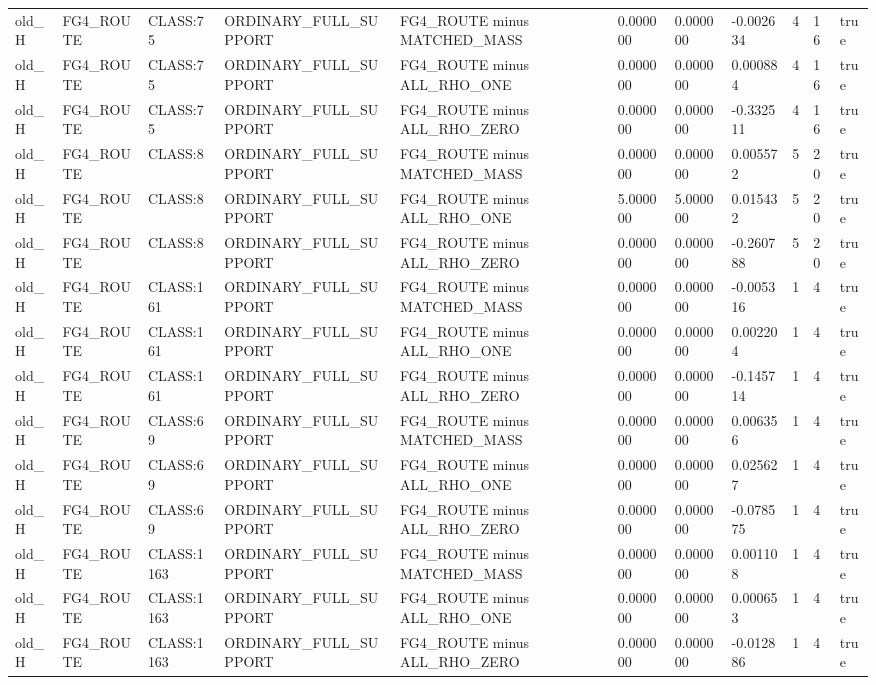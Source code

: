 \begin{tabular}{lllllllllll}
old\_H & FG4\_ROUTE & CLASS:75 & ORDINARY\_FULL\_SUPPORT & FG4\_ROUTE minus MATCHED\_MASS & 0.000000 & 0.000000 & -0.002634 & 4 & 16 & true \\
old\_H & FG4\_ROUTE & CLASS:75 & ORDINARY\_FULL\_SUPPORT & FG4\_ROUTE minus ALL\_RHO\_ONE & 0.000000 & 0.000000 & 0.000884 & 4 & 16 & true \\
old\_H & FG4\_ROUTE & CLASS:75 & ORDINARY\_FULL\_SUPPORT & FG4\_ROUTE minus ALL\_RHO\_ZERO & 0.000000 & 0.000000 & -0.332511 & 4 & 16 & true \\
old\_H & FG4\_ROUTE & CLASS:8 & ORDINARY\_FULL\_SUPPORT & FG4\_ROUTE minus MATCHED\_MASS & 0.000000 & 0.000000 & 0.005572 & 5 & 20 & true \\
old\_H & FG4\_ROUTE & CLASS:8 & ORDINARY\_FULL\_SUPPORT & FG4\_ROUTE minus ALL\_RHO\_ONE & 5.000000 & 5.000000 & 0.015432 & 5 & 20 & true \\
old\_H & FG4\_ROUTE & CLASS:8 & ORDINARY\_FULL\_SUPPORT & FG4\_ROUTE minus ALL\_RHO\_ZERO & 0.000000 & 0.000000 & -0.260788 & 5 & 20 & true \\
old\_H & FG4\_ROUTE & CLASS:161 & ORDINARY\_FULL\_SUPPORT & FG4\_ROUTE minus MATCHED\_MASS & 0.000000 & 0.000000 & -0.005316 & 1 & 4 & true \\
old\_H & FG4\_ROUTE & CLASS:161 & ORDINARY\_FULL\_SUPPORT & FG4\_ROUTE minus ALL\_RHO\_ONE & 0.000000 & 0.000000 & 0.002204 & 1 & 4 & true \\
old\_H & FG4\_ROUTE & CLASS:161 & ORDINARY\_FULL\_SUPPORT & FG4\_ROUTE minus ALL\_RHO\_ZERO & 0.000000 & 0.000000 & -0.145714 & 1 & 4 & true \\
old\_H & FG4\_ROUTE & CLASS:69 & ORDINARY\_FULL\_SUPPORT & FG4\_ROUTE minus MATCHED\_MASS & 0.000000 & 0.000000 & 0.006356 & 1 & 4 & true \\
old\_H & FG4\_ROUTE & CLASS:69 & ORDINARY\_FULL\_SUPPORT & FG4\_ROUTE minus ALL\_RHO\_ONE & 0.000000 & 0.000000 & 0.025627 & 1 & 4 & true \\
old\_H & FG4\_ROUTE & CLASS:69 & ORDINARY\_FULL\_SUPPORT & FG4\_ROUTE minus ALL\_RHO\_ZERO & 0.000000 & 0.000000 & -0.078575 & 1 & 4 & true \\
old\_H & FG4\_ROUTE & CLASS:1163 & ORDINARY\_FULL\_SUPPORT & FG4\_ROUTE minus MATCHED\_MASS & 0.000000 & 0.000000 & 0.001108 & 1 & 4 & true \\
old\_H & FG4\_ROUTE & CLASS:1163 & ORDINARY\_FULL\_SUPPORT & FG4\_ROUTE minus ALL\_RHO\_ONE & 0.000000 & 0.000000 & 0.000653 & 1 & 4 & true \\
old\_H & FG4\_ROUTE & CLASS:1163 & ORDINARY\_FULL\_SUPPORT & FG4\_ROUTE minus ALL\_RHO\_ZERO & 0.000000 & 0.000000 & -0.012886 & 1 & 4 & true \\

\end{tabular}
